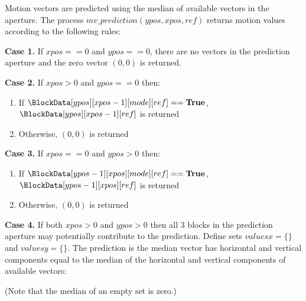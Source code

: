 Motion vectors are predicted using the median of available vectors in the aperture. The
process $mv\_prediction(ypos, xpos, ref)$ returns motion values according to
the following rules:

{\bf Case 1.}  If $xpos==0$ and $ypos==0$, there are no vectors in the prediction aperture and
the zero vector $(0, 0)$ is returned.

{\bf Case 2.} If $xpos>0$ and $ypos==0$ then:
\begin{enumerate}
   \item If $\BlockData[ypos][xpos-1][mode][ref]==\true$, $\BlockData[ypos][xpos-1][ref]$ is returned
   \item Otherwise, $(0,0)$ is returned
\end{enumerate}

{\bf Case 3.} If $xpos==0$ and $ypos>0$ then:
\begin{enumerate}
   \item If $\BlockData[ypos-1][xpos][mode][ref]==\true$, $\BlockData[ypos-1][xpos][ref]$ is returned
   \item Otherwise, $(0,0)$ is returned
\end{enumerate}

{\bf Case 4.} If both $xpos>0$ and $ypos>0$ then all 3 blocks in the prediction aperture may potentially
contribute to the prediction. Define sets $valuesx=\{\}$ and $valuesy=\{\}$. The prediction is the 
median vector has  horizontal and vertical components equal to the median of the horizontal and vertical
components of available vectors:

\begin{pseudo*}
\bsIF{\BlockData[ypos][xpos-1][mode][ref]==\true}
\bsEND
\bsIF{\BlockData[ypos-1][xpos][mode][ref]==\true}
\bsEND
\bsIF{\BlockData[ypos-1][xpos-1][mode][ref]==\true}
\bsEND


\end{pseudo*}

(Note that the median of an empty set is zero.)

